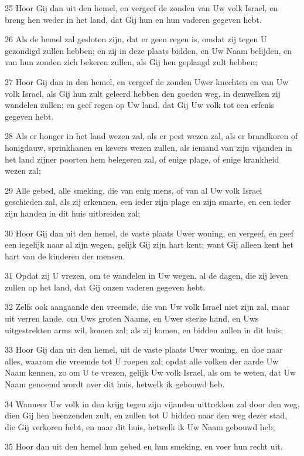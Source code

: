 \par 25 Hoor Gij dan uit den hemel, en vergeef de zonden van Uw volk Israel, en breng hen weder in het land, dat Gij hun en hun vaderen gegeven hebt.
\par 26 Als de hemel zal gesloten zijn, dat er geen regen is, omdat zij tegen U gezondigd zullen hebben; en zij in deze plaats bidden, en Uw Naam belijden, en van hun zonden zich bekeren zullen, als Gij hen geplaagd zult hebben;
\par 27 Hoor Gij dan in den hemel, en vergeef de zonden Uwer knechten en van Uw volk Israel, als Gij hun zult geleerd hebben den goeden weg, in denwelken zij wandelen zullen; en geef regen op Uw land, dat Gij Uw volk tot een erfenis gegeven hebt.
\par 28 Als er honger in het land wezen zal, als er pest wezen zal, als er brandkoren of honigdauw, sprinkhanen en kevers wezen zullen, als iemand van zijn vijanden in het land zijner poorten hem belegeren zal, of enige plage, of enige krankheid wezen zal;
\par 29 Alle gebed, alle smeking, die van enig mens, of van al Uw volk Israel geschieden zal, als zij erkennen, een ieder zijn plage en zijn smarte, en een ieder zijn handen in dit huis uitbreiden zal;
\par 30 Hoor Gij dan uit den hemel, de vaste plaats Uwer woning, en vergeef, en geef een iegelijk naar al zijn wegen, gelijk Gij zijn hart kent; want Gij alleen kent het hart van de kinderen der mensen.
\par 31 Opdat zij U vrezen, om te wandelen in Uw wegen, al de dagen, die zij leven zullen op het land, dat Gij onzen vaderen gegeven hebt.
\par 32 Zelfs ook aangaande den vreemde, die van Uw volk Israel niet zijn zal, maar uit verren lande, om Uws groten Naams, en Uwer sterke hand, en Uws uitgestrekten arms wil, komen zal; als zij komen, en bidden zullen in dit huis;
\par 33 Hoor Gij dan uit den hemel, uit de vaste plaats Uwer woning, en doe naar alles, waarom die vreemde tot U roepen zal; opdat alle volken der aarde Uw Naam kennen, zo om U te vrezen, gelijk Uw volk Israel, als om te weten, dat Uw Naam genoemd wordt over dit huis, hetwelk ik gebouwd heb.
\par 34 Wanneer Uw volk in den krijg tegen zijn vijanden uittrekken zal door den weg, dien Gij hen heenzenden zult, en zullen tot U bidden naar den weg dezer stad, die Gij verkoren hebt, en naar dit huis, hetwelk ik Uw Naam gebouwd heb;
\par 35 Hoor dan uit den hemel hun gebed en hun smeking, en voer hun recht uit.
